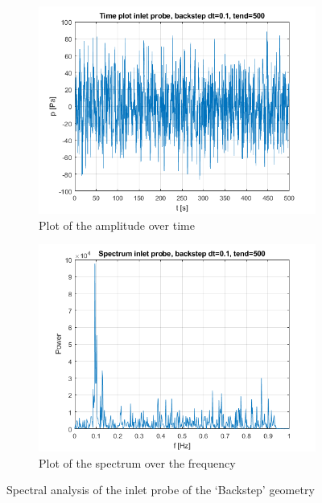 \documentclass[fleqn,12pt]{NTFD} %
\begin{document}
\begin{figure}[H]
\centering
\begin{subfigure}{.5\textwidth}
  \centering
  \includegraphics[width=.8\linewidth]{backstep_time_inlet.png}
  \caption{Plot of the amplitude over time}
  \label{fig:Plot of the amplitude over time}
\end{subfigure}%
\begin{subfigure}{.5\textwidth}
  \centering
  \includegraphics[width=.8\linewidth]{backstep_spectrum_inlet.png}
  \caption{Plot of the spectrum over the frequency}
  \label{fig:sub2}
\end{subfigure}
\caption{Spectral analysis of the inlet probe of the `Backstep' geometry}
\label{fig:spectral backstep inlet}
\end{figure}
\end{document}
